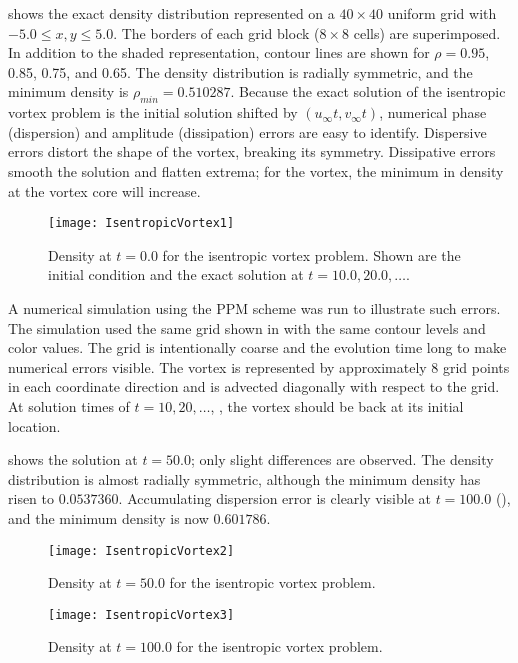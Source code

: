  shows the exact density distribution represented on
a $40 \times 40$ uniform grid with $-5.0 \leq x, y \leq 5.0$. The
borders of each grid block ($8 \times 8$ cells) are superimposed. In
addition to the shaded representation, contour lines are shown for
$\rho = 0.95$, 0.85, 0.75, and 0.65. The density distribution is
radially symmetric, and the minimum density is $\rho_{min} =
0.510287$. Because the exact solution of the isentropic vortex
problem is the initial solution shifted by $(u_\infty t, v_\infty
t)$, numerical phase (dispersion) and amplitude (dissipation) errors
are easy to identify. Dispersive errors distort the shape of the
vortex, breaking its symmetry.  Dissipative errors smooth the
solution and flatten extrema; for the vortex, the minimum in density
at the vortex core will increase.
\begin{figure}[!ht]
\begin{center}
{\leavevmode\texttt{[image: IsentropicVortex1]}}
\end{center}
\caption{\label{Fig:iv1} Density at $t=0.0$ for the isentropic vortex 
problem. Shown are the initial condition and the exact solution
at $t=10.0, 20.0, \ldots$.}
\end{figure}

A numerical simulation using the PPM scheme was run to illustrate
such errors. The simulation used the same grid shown in
 with the same contour levels and color values. The
grid is intentionally coarse and the evolution time long to make
numerical errors visible.  The vortex is represented by
approximately 8 grid points in each coordinate direction and is
advected diagonally with respect to the grid.  At solution times of
$t=10, 20, \ldots$, \etc, the vortex should be back at its initial
location.

 shows the solution at $t=50.0$; only slight
differences are observed. The density distribution is almost
radially symmetric, although the minimum density has risen to
$0.0537360$. Accumulating dispersion error is clearly visible at
$t=100.0$ (), and the minimum density is now
$0.601786$.
\begin{figure}
\begin{center}
{\leavevmode\texttt{[image: IsentropicVortex2]}}
\end{center}
\caption{\label{Fig:iv2} Density at $t=50.0$ for the isentropic
vortex problem.}
\end{figure}

\begin{figure}
\begin{center}
{\leavevmode\texttt{[image: IsentropicVortex3]}}
\end{center}
\caption{\label{Fig:iv3} Density at $t=100.0$ for the isentropic
vortex problem.}
\end{figure}

